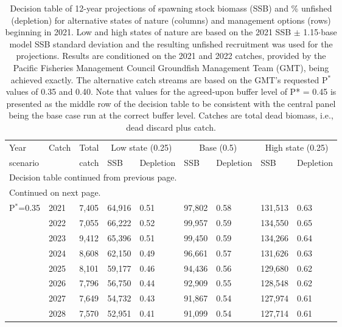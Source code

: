 \documentclass[11pt,
  english,
  a4paper,
]{article}
\begin{document}
\begingroup\fontsize{9}{11}\selectfont
\begingroup\fontsize{9}{11}\selectfont
{}
\begin{longtable}{lll|ll|ll|ll}
\caption{Decision table of 12-year projections of spawning stock biomass (SSB) and \% unfished (depletion) for alternative states of nature (columns) and management options (rows) beginning in 2021. Low and high states of nature are based on the 2021 SSB $\pm$ 1.15$\cdot$base model SSB standard deviation and the resulting unfished recruitment was used for the projections. Results are conditioned on the 2021 and 2022 catches, provided by the Pacific Fisheries Management Council Groundfish Management Team (GMT), being achieved exactly. The alternative catch streams are based on the GMT's requested P$^*$ values of 0.35 and 0.40. Note that values for the agreed-upon buffer level of P* = 0.45  is presented as the middle row of the decision table to be consistent with the central panel being the base case run at the correct buffer level. Catches are total dead biomass, i.e., dead discard plus catch.} \\ 
  \hline
Year&Catch&Total& \multicolumn{2}{c}{Low state (0.25)} & \multicolumn{2}{c}{Base (0.5)} & \multicolumn{2}{c}{High state (0.25)} \\ 
scenario & &catch& SSB & Depletion & SSB & Depletion & SSB & Depletion \\ 
\hline \endfirsthead
\multicolumn{9}{l}{\footnotesize Decision table continued from previous page.} \\
\hline \endhead
\hline
\multicolumn{9}{l}{\footnotesize Continued on next page.} \\
\endfoot
\endlastfoot
\hline
P$^*$=0.35
& 2021 & 7,405 & 64,916 & 0.51 & 97,802& 0.58 & 131,513 & 0.63 \\ 
&  2022 & 7,055 & 66,222 & 0.52 & 99,957 & 0.59 & 134,550 & 0.65 \\ 
&  2023 & 9,412 & 65,396 & 0.51 & 99,450 & 0.59 & 134,266 & 0.64 \\ 
&  2024 & 8,608 & 62,150 & 0.49 & 96,661 & 0.57 & 131,626 & 0.63 \\ 
&  2025 & 8,101 & 59,177 & 0.46 & 94,436 & 0.56 & 129,680 & 0.62 \\ 
&  2026 & 7,796 & 56,750 & 0.44 & 92,909 & 0.55 & 128,548 & 0.62 \\ 
&  2027 & 7,649 & 54,732 & 0.43 & 91,867 & 0.54 & 127,974 & 0.61 \\ 
&  2028 & 7,570 & 52,951 & 0.41 & 91,099 & 0.54 & 127,714 & 0.61 \\ 

\end{longtable}
\end{document}
